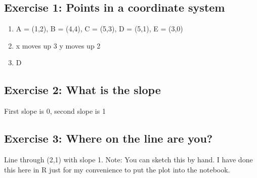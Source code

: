\documentclass[letterpaper,10pt,english]{jupyterBook}
\begin{document}
\subsection{Exercise 1: Points in a coordinate system}
\label{\detokenize{exercises_unit_4:exercise-1-points-in-a-coordinate-system}}\begin{enumerate}
%
\item {} 
\sphinxAtStartPar
A = (1,2), B = (4,4), C = (5,3), D = (5,1), E = (3,0)

\item {} 
\sphinxAtStartPar
x moves up 3 y moves up 2

\item {} 
\sphinxAtStartPar
D

\end{enumerate}


\subsection{Exercise 2: What is the slope}
\label{\detokenize{exercises_unit_4:exercise-2-what-is-the-slope}}
\sphinxAtStartPar
First slope is 0, second slope is \sphinxhyphen{}1


\subsection{Exercise 3: Where on the line are you?}
\label{\detokenize{exercises_unit_4:exercise-3-where-on-the-line-are-you}}
\sphinxAtStartPar
Line through (2,1) with slope 1. Note: You can sketch this by hand. I have done this here in R just for my convenience to put the plot into the notebook.
\end{document}

